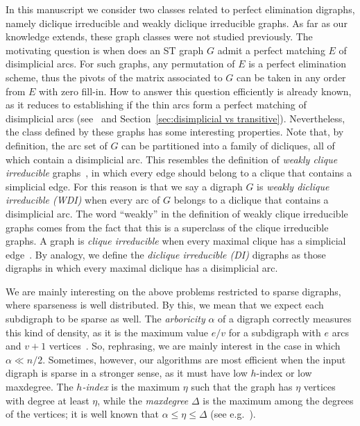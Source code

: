 \documentclass[a4paper,11pt]{article}
\begin{document}
In this manuscript we consider two classes related to perfect elimination digraphs, namely diclique irreducible and weakly diclique irreducible graphs.  As far as our knowledge extends, these graph classes were not studied previously.  The motivating question is when does an ST graph $G$ admit a perfect matching $E$ of disimplicial arcs.  For such graphs, any permutation of $E$ is a perfect elimination scheme, thus the pivots of the matrix associated to $G$ can be taken in any order from $E$ with zero fill-in.  How to answer this question efficiently is already known, as it reduces to establishing if the thin arcs form a perfect matching of disimplicial arcs (see~\cite{BomhoffMantheyDAM2013} and Section~\ref{sec:disimplicial vs transitive}).  Nevertheless, the class defined by these graphs has some interesting properties.  Note that, by definition, the arc set of $G$ can be partitioned into a family of dicliques, all of which contain a disimplicial arc.  This resembles the definition of \emph{weakly clique irreducible} graphs~\cite{WangCN2003}, in which every edge should belong to a clique that contains a simplicial edge.  For this reason is that we say a digraph $G$ is \emph{weakly diclique irreducible (WDI)} when every arc of $G$ belongs to a diclique that contains a disimplicial arc.  The word ``weakly'' in the definition of weakly clique irreducible graphs comes from the fact that this is a superclass of the clique irreducible graphs.  A graph is \emph{clique irreducible} when every maximal clique has a simplicial edge~\cite{WallisZhangJCMCC1990}.  By analogy, we define the \emph{diclique irreducible (DI)} digraphs as those digraphs in which every maximal diclique has a disimplicial arc.  

We are mainly interesting on the above problems restricted to sparse digraphs, where sparseness is well distributed.  By this, we mean that we expect each subdigraph to be sparse as well.  The \emph{arboricity} $\alpha$ of a digraph correctly measures this kind of density, as it is the maximum value $e/v$ for a subdigraph with $e$ arcs and $v+1$ vertices~\cite{Nash-WilliamsJLMS1964}.  So, rephrasing, we are mainly interest in the case in which $\alpha \ll n/2$.  Sometimes, however, our algorithms are most efficient when the input digraph is sparse in a stronger sense, as it must have low $h$-index or low maxdegree.  The \emph{$h$-index} is the maximum $\eta$ such that the graph has $\eta$ vertices with degree at least $\eta$, while the \emph{maxdegree} $\Delta$ is the maximum among the degrees of the vertices; it is well known that $\alpha \leq \eta \leq \Delta$ (see e.g.~\cite{LinSoulignacSzwarcfiterTCS2012}).
\end{document}
